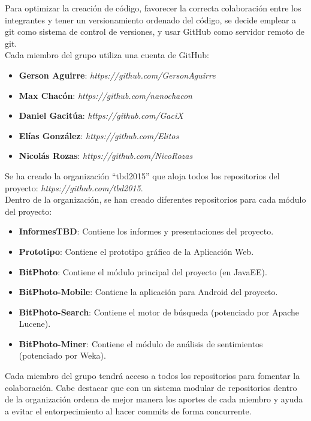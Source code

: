 \documentclass{memoria}
\begin{document}
\newpage

    
Para optimizar la creación de código, favorecer la correcta colaboración entre los integrantes y tener un versionamiento ordenado del código, se decide emplear a git como sistema de control de versiones, y usar GitHub como servidor remoto de git.\\

Cada miembro del grupo utiliza una cuenta de GitHub:

\begin{itemize}
	\item \textbf{Gerson Aguirre}: \textsl{https://github.com/GersonAguirre}
	\item \textbf{Max Chacón}: \textsl{https://github.com/nanochacon}
	\item \textbf{Daniel Gacitúa}: \textsl{https://github.com/GaciX}
	\item \textbf{Elías González}: \textsl{https://github.com/Elitos}
	\item \textbf{Nicolás Rozas}: \textsl{https://github.com/NicoRozas}
\end{itemize}

Se ha creado la organización “tbd2015” que aloja todos los repositorios del proyecto: \textsl{https://github.com/tbd2015}.\\

Dentro de la organización, se han creado diferentes repositorios para cada módulo del proyecto:

\begin{itemize}
	\item \textbf{InformesTBD}: Contiene los informes y presentaciones del proyecto. 
	\item \textbf{Prototipo}: Contiene el prototipo gráfico de la Aplicación Web.
	\item \textbf{BitPhoto}: Contiene el módulo principal del proyecto (en JavaEE).
	\item \textbf{BitPhoto-Mobile}: Contiene la aplicación para Android del proyecto.
	\item \textbf{BitPhoto-Search}: Contiene el motor de búsqueda (potenciado por Apache Lucene).
	\item \textbf{BitPhoto-Miner}: Contiene el módulo de análisis de sentimientos (potenciado por Weka).
\end{itemize}

Cada miembro del grupo tendrá acceso a todos los repositorios para fomentar la colaboración. Cabe destacar que con un sistema modular de repositorios dentro de la organización ordena de mejor manera los aportes de cada miembro y ayuda a evitar el entorpecimiento al hacer commits de forma concurrente.
\end{document}
